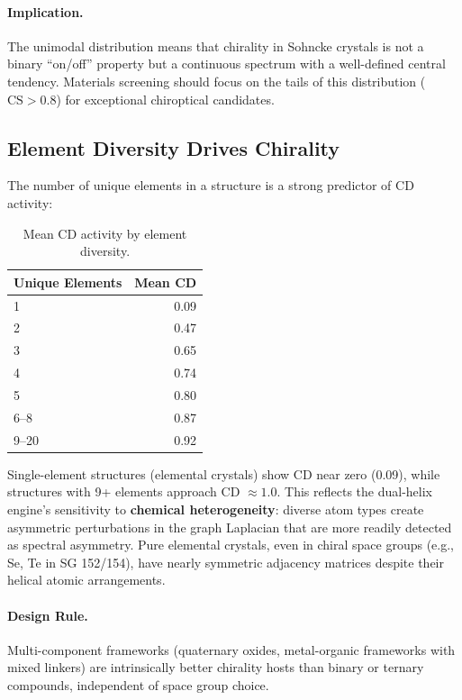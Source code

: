 \documentclass[11pt,a4paper]{article}
\begin{document}
\paragraph{Implication.} The unimodal distribution means that chirality in Sohncke crystals is not a binary ``on/off'' property but a continuous spectrum with a well-defined central tendency. Materials screening should focus on the tails of this distribution ($\text{CS} > 0.8$) for exceptional chiroptical candidates.

\subsection{Element Diversity Drives Chirality}

The number of unique elements in a structure is a strong predictor of CD activity:

\begin{table}[H]
\centering
\caption{Mean CD activity by element diversity.}
\label{tab:elem_div}
\begin{tabular}{lr}
\toprule
Unique Elements & Mean CD \\
\midrule
1 & 0.09 \\
2 & 0.47 \\
3 & 0.65 \\
4 & 0.74 \\
5 & 0.80 \\
6--8 & 0.87 \\
9--20 & 0.92 \\
\bottomrule
\end{tabular}
\end{table}

\noindent Single-element structures (elemental crystals) show CD near zero (0.09), while structures with 9+ elements approach CD $\approx 1.0$. This reflects the dual-helix engine's sensitivity to \textbf{chemical heterogeneity}: diverse atom types create asymmetric perturbations in the graph Laplacian that are more readily detected as spectral asymmetry. Pure elemental crystals, even in chiral space groups (e.g., Se, Te in SG 152/154), have nearly symmetric adjacency matrices despite their helical atomic arrangements.

\paragraph{Design Rule.} Multi-component frameworks (quaternary oxides, metal-organic frameworks with mixed linkers) are intrinsically better chirality hosts than binary or ternary compounds, independent of space group choice.
\end{document}
